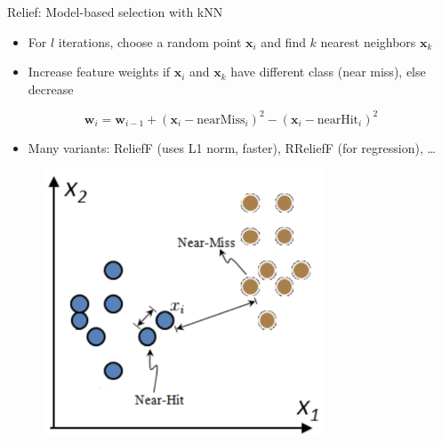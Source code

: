 \begin{frame}[allowframebreaks]{Relief: Model-based selection with kNN}
\begin{itemize}
    \item For $l$ iterations, choose a random point $\mathbf{x}_i$ and find $k$ nearest neighbors $\mathbf{x}_k$
    \item Increase feature weights if $\mathbf{x}_i$ and $\mathbf{x}_k$ have different class (near miss), else decrease
\end{itemize}

\[
\mathbf{w}_i = \mathbf{w}_{i-1} + (\mathbf{x}_i - \text{nearMiss}_i)^2 - (\mathbf{x}_i - \text{nearHit}_i)^2
\]

\begin{itemize}
    \item Many variants: ReliefF (uses L1 norm, faster), RReliefF (for regression), \ldots
\end{itemize}

\begin{figure}
    \centering
    \includegraphics[width=0.75\textwidth,keepaspectratio]{images/pre-processing/relief.png}
\end{figure}
\end{frame}

